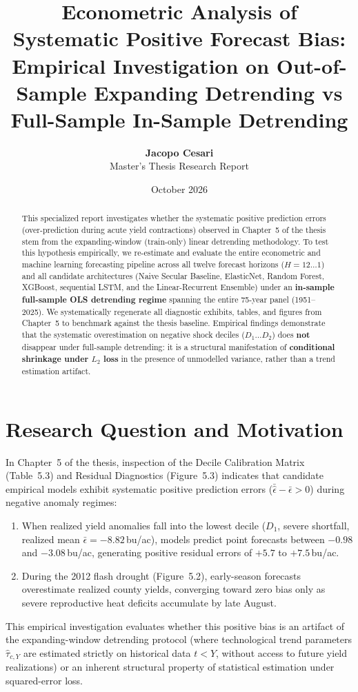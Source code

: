 \documentclass[11pt,a4paper]{article}
\title{\textbf{Econometric Analysis of Systematic Positive Forecast Bias:}\\
\large Empirical Investigation on Out-of-Sample Expanding Detrending vs Full-Sample In-Sample Detrending}
\author{\textbf{Jacopo Cesari} \\ Master's Thesis Research Report}
\date{October 2026}
\begin{document}
\maketitle

\begin{abstract}
\noindent This specialized report investigates whether the systematic positive prediction errors (over-prediction during acute yield contractions) observed in Chapter~5 of the thesis stem from the expanding-window (train-only) linear detrending methodology. To test this hypothesis empirically, we re-estimate and evaluate the entire econometric and machine learning forecasting pipeline across all twelve forecast horizons ($H = 12 \dots 1$) and all candidate architectures (Naive Secular Baseline, ElasticNet, Random Forest, XGBoost, sequential LSTM, and the Linear-Recurrent Ensemble) under an \textbf{in-sample full-sample OLS detrending regime} spanning the entire 75-year panel (1951--2025). We systematically regenerate all diagnostic exhibits, tables, and figures from Chapter~5 to benchmark against the thesis baseline. Empirical findings demonstrate that the systematic overestimation on negative shock deciles ($D_1 \dots D_2$) does \textbf{not} disappear under full-sample detrending: it is a structural manifestation of \textbf{conditional shrinkage under $L_2$ loss} in the presence of unmodelled variance, rather than a trend estimation artifact.
\end{abstract}

\section{Research Question and Motivation}

In Chapter~5 of the thesis, inspection of the Decile Calibration Matrix (Table~5.3) and Residual Diagnostics (Figure~5.3) indicates that candidate empirical models exhibit systematic positive prediction errors ($\bar{\hat{\epsilon}} - \bar{\epsilon} > 0$) during negative anomaly regimes:
\begin{enumerate}
    \item When realized yield anomalies fall into the lowest decile ($D_1$, severe shortfall, realized mean $\bar{\epsilon} = -8.82$\,bu/ac), models predict point forecasts between $-0.98$ and $-3.08$\,bu/ac, generating positive residual errors of $+5.7$ to $+7.5$\,bu/ac.
    \item During the 2012 flash drought (Figure~5.2), early-season forecasts overestimate realized county yields, converging toward zero bias only as severe reproductive heat deficits accumulate by late August.
\end{enumerate}
This empirical investigation evaluates whether this positive bias is an artifact of the expanding-window detrending protocol (where technological trend parameters $\hat{\tau}_{c,Y}$ are estimated strictly on historical data $t < Y$, without access to future yield realizations) or an inherent structural property of statistical estimation under squared-error loss.
\end{document}
